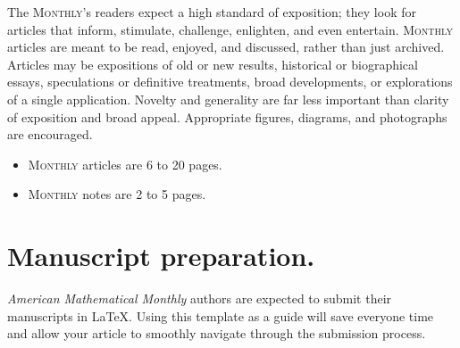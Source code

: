 \documentclass{article}
\theoremstyle{theorem}
\theoremstyle{definition}
\begin{document}
\maketitle


\begin{abstract}
Abstracts for articles or notes should entice the prospective reader into exploring the subject of the paper and should make it clear to the reader why this paper is interesting and important. The abstract should highlight the concepts of the paper rather than summarize the mechanics. The abstract is the first impression of the paper, not a technical summary of the paper. Excessive use of notation is discouraged as it can limit the interest of the broad readership of the MAA, and can limit searchability of the article. Your abstract should be 250 words or less.
\end{abstract}

\vspace{10px}


\vspace{10px}


The \textsc{Monthly}'s readers expect a high standard of exposition; they look for articles that inform, stimulate, challenge, enlighten, and even entertain. \textsc{Monthly} articles are meant to be read, enjoyed, and discussed, rather than just archived. Articles may be expositions of old or new results, historical or biographical essays, speculations or definitive treatments, broad developments, or explorations of a single application. Novelty and generality are far less important than clarity of exposition and broad appeal. Appropriate figures, diagrams, and photographs are encouraged.

\begin{itemize}
\item \textsc{Monthly} articles are 6 to 20 pages.  
\item \textsc{Monthly} notes are 2 to 5 pages.
\end{itemize}

\section{Manuscript preparation.}  \textit{American Mathematical Monthly} authors are expected to submit their manuscripts in \LaTeX. Using this template as a guide will save everyone time and allow your article to smoothly navigate through the submission process.
\end{document}
